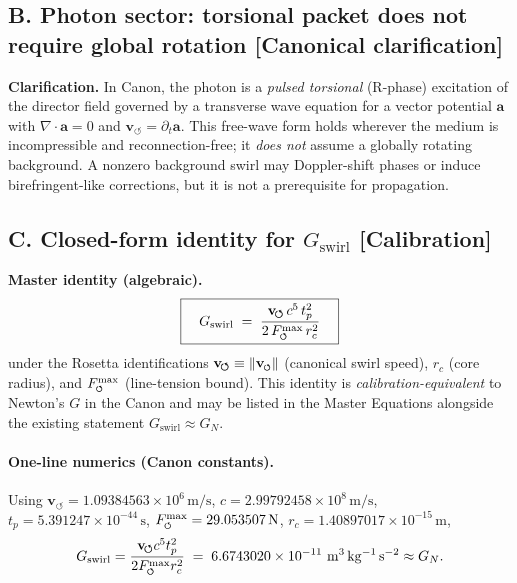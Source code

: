 \documentclass[10pt,reprint,aps,onecolumn,nofootinbib]{revtex4-2}
\newcommand{\vswirl}{\mathbf{v}_{\!\boldsymbol{\circlearrowleft}}}
\newcommand{\Fmaxswirl}{F^{\max}_{\mkern-1mu\scriptscriptstyle\boldsymbol{\circlearrowleft}}}
\newcommand{\Fmax}{\Fmaxswirl} %
\newcommand{\vnorm}{\lVert \mathbf{v}_{\mkern-2mu\scriptscriptstyle\boldsymbol{\circlearrowleft}} \rVert}               %
\newcommand{\Ce}{\vswirl}                                %
\newcommand{\rc}{r_c}                                    %
\newcommand{\statusCalibration}{\textsf{[Calibration]}}
\newcommand{\statusCanonical}{\textsf{[Canonical clarification]}}
\providecommand{\rc}{r_c}
\begin{document}
    \subsection*{B. Photon sector: torsional packet does not require global rotation \statusCanonical}
    \textbf{Clarification.}
    In Canon, the photon is a \emph{pulsed torsional} (R-phase) excitation of the director field governed by a transverse wave equation for a vector potential \(\mathbf a\) with \(\nabla\!\cdot\!\mathbf a=0\) and \(\vswirl=\partial_t\mathbf a\). This free-wave form holds wherever the medium is incompressible and reconnection-free; it \emph{does not} assume a globally rotating background. A nonzero background swirl may Doppler-shift phases or induce birefringent-like corrections, but it is not a prerequisite for propagation.

    \subsection*{C. Closed-form identity for \(G_{\text{swirl}}\) \statusCalibration}
    \textbf{Master identity (algebraic).}
    \[
        \boxed{\quad
        G_{\text{swirl}}
            \;=\;
            \frac{\Ce\,c^{5}\,t_p^{2}}{2\,\Fmax\,\rc^{2}}
            \quad}
    \]
    under the Rosetta identifications \(\Ce\equiv \vnorm\) (canonical swirl speed), \(\rc\) (core radius), and \(\Fmax\) (line-tension bound). This identity is \emph{calibration-equivalent} to Newton’s \(G\) in the Canon and may be listed in the Master Equations alongside the existing statement \(G_{\text{swirl}}\approx G_N\).

    \paragraph{One-line numerics (Canon constants).}
        Using
        \(\Ce=1.09384563\times10^{6}\,\mathrm{m/s}\),
        \(c=2.99792458\times10^{8}\,\mathrm{m/s}\),
        \(t_p=5.391247\times10^{-44}\,\mathrm{s}\),
        \(\Fmax=29.053507\,\mathrm{N}\),
        \(\rc=1.40897017\times10^{-15}\,\mathrm{m}\),
        \[
            G_{\text{swirl}}
            =\frac{\Ce c^5 t_p^2}{2\Fmax \rc^2}
            \;=\;6.6743020\times10^{-11}\ \mathrm{m^3\,kg^{-1}\,s^{-2}}
            \approx G_N.
        \]

\end{document}

